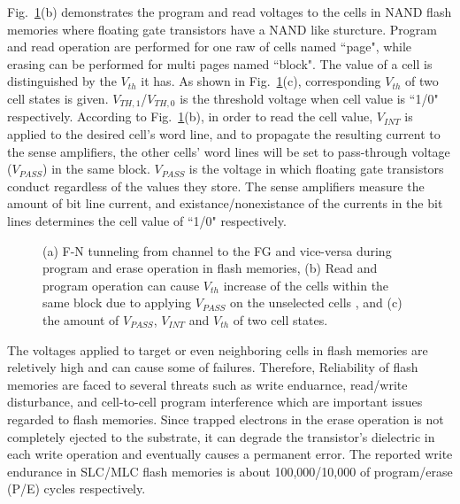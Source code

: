 Fig.~\ref{fig:FLASH_CELL}(b) demonstrates the program and read voltages to the cells in NAND flash memories where floating gate transistors have a NAND like sturcture. Program and read operation are performed for one raw of cells named ``page", while erasing can be performed for multi pages named ``block". The value of a cell is distinguished by the $V_{th}$ it has. As shown in Fig.~\ref{fig:FLASH_CELL}(c), corresponding $V_{th}$ of two cell states is given. $V_{TH,1}$/$V_{TH,0}$ is the threshold voltage when cell value is ``1/0" respectively. According to Fig.~\ref{fig:FLASH_CELL}(b), in order to read the cell value, $V_{INT}$ is applied to the desired cell's word line, and to propagate the resulting current to the sense amplifiers, the other cells' word lines will be set to pass-through voltage ($V_{PASS}$) in the same block. $V_{PASS}$ is the voltage in which floating gate transistors conduct regardless of the values they store. The sense amplifiers measure the amount of bit line current, and existance/nonexistance of the currents in the bit lines determines the cell value of ``1/0" respectively. 

\begin{figure}[!t]
	\centering
	\hfil
	\hspace{-.8pt}
	\hfil
	\hspace{-.8pt}
	
	\vspace{-0.5em}
	\caption{(a) F-N tunneling from channel to the FG and vice-versa during program and erase operation in flash memories, (b) Read and program operation can cause $V_{th}$ increase of the cells within the same block due to applying $V_{PASS}$ on the unselected cells , and (c) the amount of $V_{PASS}$, $V_{INT}$ and $V_{th}$ of two cell states.}
	\vspace{-1.1em}
	\label{fig:FLASH_CELL}
\end{figure}


The voltages applied to target or even neighboring cells in flash memories are reletively high and can cause some of failures. Therefore, Reliability of flash memories are faced to several threats such as write enduarnce, read/write disturbance, and cell-to-cell program interference which are important issues regarded to flash memories. Since trapped electrons in the erase operation is not completely ejected to the substrate, it can degrade the transistor's dielectric in each write operation and eventually causes a permanent error. The reported write endurance in SLC/MLC flash memories is about 100,000/10,000 of program/erase (P/E) cycles respectively.

